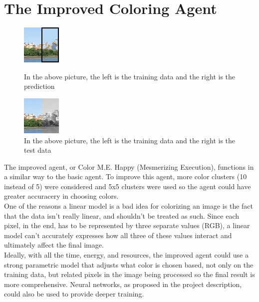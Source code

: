 \documentclass[12pt]{report}
\begin{document}
\section*{The Improved Coloring Agent}
\begin{figure}
\includegraphics[width=.5\textwidth]{Improved Agent Prediction}
\caption{In the above picture, the left is the training data and the right is the prediction}
\includegraphics[width=.5\textwidth]{Test Image}
\caption{In the above picture, the left is the training data and the right is the test data}
\end{figure}
The improved agent, or Color M.E. Happy (Mesmerizing Execution), functions in a similar way to the basic agent. To improve this agent, more color clusters (10 instead of 5) were considered and 5x5 clusters were used so the agent could have greater accuracery in choosing colors.\\
One of the reasons a linear model is a bad idea for colorizing an image is the fact that the data isn't really linear, and shouldn't be treated as such. Since each pixel, in the end, has to be represented by three separate values (RGB), a linear model can't accurately expresses how all three of these values interact and ultimately affect the final image.\\
Ideally, with all the time, energy, and resources, the improved agent could use a strong parametric model that adjusts what color is chosen based, not only on the training data, but related pixels in the image being processed so the final result is more comprehensive. Neural networks, as proposed in the project description, could also be used to provide deeper training.
\end{document}
